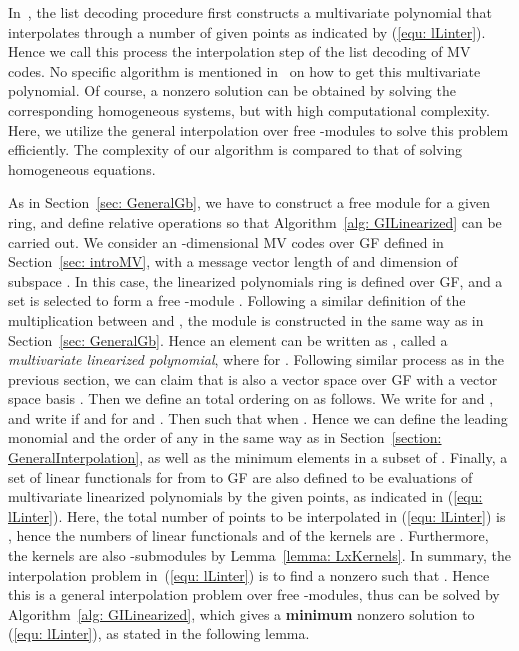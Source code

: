 \documentclass[11pt,onecolumn,draftcls]{IEEEtran}
\begin{document}
In~\cite{mahdavifar_isit10}, the list decoding procedure first constructs a multivariate polynomial  that interpolates through a number of given points as indicated by (\ref{equ: lLinter}). Hence we call this process the interpolation step of the list decoding of MV codes. No specific algorithm is mentioned in~\cite{mahdavifar_isit10} on how to get this multivariate polynomial. Of course, a nonzero solution can be obtained by solving the corresponding homogeneous systems, but with high computational complexity. Here, we utilize the general interpolation over free -modules to solve this problem efficiently. The complexity of our algorithm is compared to that of  solving homogeneous equations.

As in Section~\ref{sec: GeneralGb}, we have to construct a free module for a given ring, and define relative operations so that Algorithm~\ref{alg: GILinearized} can be carried out. We consider an -dimensional MV codes over GF defined in Section~\ref{sec: introMV}, with a message vector length of  and dimension of subspace . In this case, the linearized polynomials ring  is defined over GF, and a set  is selected to form a free -module . Following a similar definition of the multiplication between  and , the module  is constructed in the same way as in Section~\ref{sec: GeneralGb}. Hence an element  can be written as , called a \emph{multivariate linearized polynomial}, where  for .  Following similar process as in the previous section, we can claim that  is also a vector space over GF with a vector space basis . Then we define an total ordering on  as follows. We write  for  and , and write  if  and  for  and . Then  such that  when . Hence we can define the leading monomial and the order of any  in the same way as in Section~\ref{section: GeneralInterpolation}, as well as the minimum elements in a subset of . Finally, a set of linear functionals  for  from  to GF are also defined to be evaluations of multivariate linearized polynomials by the given points, as indicated in (\ref{equ: lLinter}). Here, the total number of points to be interpolated in (\ref{equ: lLinter}) is , hence the numbers of linear functionals  and of the kernels  are . Furthermore, the kernels  are also -submodules by Lemma~\ref{lemma: LxKernels}. In summary, the interpolation problem in~(\ref{equ: lLinter}) is to find a nonzero  such that . Hence this is a general interpolation problem over free -modules, thus can be solved by Algorithm~\ref{alg: GILinearized}, which gives a \textbf{minimum} nonzero solution to (\ref{equ: lLinter}), as stated in the following lemma.
\end{document}
